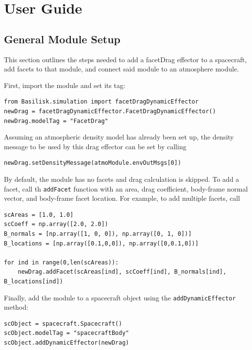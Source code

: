 
\section{User Guide}

\subsection{General Module Setup}
This section outlines the steps needed to add a facetDrag effector to a spacecraft, add facets to that module, and connect said module to an atmosphere module.

First, import the module and set its tag:
\begin{verbatim}
from Basilisk.simulation import facetDragDynamicEffector
newDrag = facetDragDynamicEffector.FacetDragDynamicEffector()
newDrag.modelTag = "FacetDrag"
\end{verbatim}

Assuming an atmospheric density model has already been set up, the density message to be used by this drag effector can be set by calling
\begin{verbatim}
newDrag.setDensityMessage(atmoModule.envOutMsgs[0])
\end{verbatim}

By default, the module has no facets and drag calculation is skipped. To add a facet, call th \verb|addFacet| function with an area, drag coefficient, body-frame normal vector, and body-frame facet location. For example, to add multiple facets, call
\begin{verbatim}
scAreas = [1.0, 1.0]
scCoeff = np.array([2.0, 2.0])
B_normals = [np.array([1, 0, 0]), np.array([0, 1, 0])]
B_locations = [np.array([0.1,0,0]), np.array([0,0.1,0])]

for ind in range(0,len(scAreas)):
	newDrag.addFacet(scAreas[ind], scCoeff[ind], B_normals[ind], B_locations[ind])
\end{verbatim}


Finally, add the module to a spacecraft object using the \verb|addDynamicEffector| method:
\begin{verbatim}
scObject = spacecraft.Spacecraft()
scObject.modelTag = "spacecraftBody"
scObject.addDynamicEffector(newDrag)
\end{verbatim}
